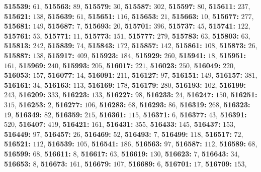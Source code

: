 \textsf{\bfseries 515539:} $61$, \textsf{\bfseries 515563:} $89$, \textsf{\bfseries 515579:} $30$, \textsf{\bfseries 515587:} $302$, \textsf{\bfseries 515597:} $80$, \textsf{\bfseries 515611:} $237$, \textsf{\bfseries 515621:} $138$, \textsf{\bfseries 515639:} $61$, \textsf{\bfseries 515651:} $116$, \textsf{\bfseries 515653:} $21$, \textsf{\bfseries 515663:} $10$, \textsf{\bfseries 515677:} $277$, \textsf{\bfseries 515681:} $149$, \textsf{\bfseries 515687:} $7$, \textsf{\bfseries 515693:} $20$, \textsf{\bfseries 515701:} $396$, \textsf{\bfseries 515737:} $45$, \textsf{\bfseries 515741:} $122$, \textsf{\bfseries 515761:} $53$, \textsf{\bfseries 515771:} $11$, \textsf{\bfseries 515773:} $151$, \textsf{\bfseries 515777:} $279$, \textsf{\bfseries 515783:} $63$, \textsf{\bfseries 515803:} $63$, \textsf{\bfseries 515813:} $242$, \textsf{\bfseries 515839:} $74$, \textsf{\bfseries 515843:} $172$, \textsf{\bfseries 515857:} $142$, \textsf{\bfseries 515861:} $108$, \textsf{\bfseries 515873:} $26$, \textsf{\bfseries 515887:} $138$, \textsf{\bfseries 515917:} $409$, \textsf{\bfseries 515923:} $184$, \textsf{\bfseries 515929:} $260$, \textsf{\bfseries 515941:} $18$, \textsf{\bfseries 515951:} $161$, \textsf{\bfseries 515969:} $240$, \textsf{\bfseries 515993:} $205$, \textsf{\bfseries 516017:} $221$, \textsf{\bfseries 516023:} $250$, \textsf{\bfseries 516049:} $220$, \textsf{\bfseries 516053:} $157$, \textsf{\bfseries 516077:} $14$, \textsf{\bfseries 516091:} $211$, \textsf{\bfseries 516127:} $97$, \textsf{\bfseries 516151:} $149$, \textsf{\bfseries 516157:} $381$, \textsf{\bfseries 516161:} $34$, \textsf{\bfseries 516163:} $113$, \textsf{\bfseries 516169:} $178$, \textsf{\bfseries 516179:} $280$, \textsf{\bfseries 516193:} $102$, \textsf{\bfseries 516199:} $243$, \textsf{\bfseries 516209:} $333$, \textsf{\bfseries 516223:} $133$, \textsf{\bfseries 516227:} $98$, \textsf{\bfseries 516233:} $24$, \textsf{\bfseries 516247:} $150$, \textsf{\bfseries 516251:} $315$, \textsf{\bfseries 516253:} $2$, \textsf{\bfseries 516277:} $106$, \textsf{\bfseries 516283:} $68$, \textsf{\bfseries 516293:} $86$, \textsf{\bfseries 516319:} $268$, \textsf{\bfseries 516323:} $19$, \textsf{\bfseries 516349:} $82$, \textsf{\bfseries 516359:} $215$, \textsf{\bfseries 516361:} $115$, \textsf{\bfseries 516371:} $6$, \textsf{\bfseries 516377:} $43$, \textsf{\bfseries 516391:} $520$, \textsf{\bfseries 516407:} $419$, \textsf{\bfseries 516421:} $161$, \textsf{\bfseries 516431:} $355$, \textsf{\bfseries 516433:} $145$, \textsf{\bfseries 516437:} $153$, \textsf{\bfseries 516449:} $97$, \textsf{\bfseries 516457:} $26$, \textsf{\bfseries 516469:} $52$, \textsf{\bfseries 516493:} $7$, \textsf{\bfseries 516499:} $118$, \textsf{\bfseries 516517:} $72$, \textsf{\bfseries 516521:} $112$, \textsf{\bfseries 516539:} $105$, \textsf{\bfseries 516541:} $186$, \textsf{\bfseries 516563:} $97$, \textsf{\bfseries 516587:} $112$, \textsf{\bfseries 516589:} $68$, \textsf{\bfseries 516599:} $68$, \textsf{\bfseries 516611:} $8$, \textsf{\bfseries 516617:} $63$, \textsf{\bfseries 516619:} $130$, \textsf{\bfseries 516623:} $7$, \textsf{\bfseries 516643:} $34$, \textsf{\bfseries 516653:} $8$, \textsf{\bfseries 516673:} $161$, \textsf{\bfseries 516679:} $107$, \textsf{\bfseries 516689:} $6$, \textsf{\bfseries 516701:} $17$, \textsf{\bfseries 516709:} $153$, 
